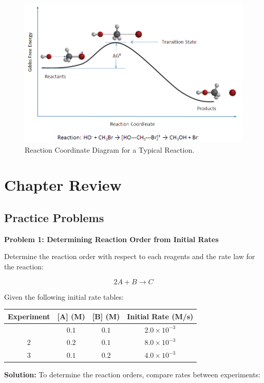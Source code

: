 \documentclass[
  9pt,
]{extbook}
\theoremstyle{definition}
\theoremstyle{definition}
\theoremstyle{definition}
\theoremstyle{definition}
\theoremstyle{remark}
\begin{document}
\begin{figure}

{\centering \includegraphics[width=0.7\linewidth]{./img/Rxn_coordinate_diagram_5} 

}

\caption{Reaction Coordinate Diagram for a Typical Reaction.}\label{fig:figk9}
\end{figure}

\section{Chapter Review}\label{rev15}

\subsection{Practice Problems}\label{exer15}

\textbf{Problem 1: Determining Reaction Order from Initial Rates}

Determine the reaction order with respect to each reagents and the rate law for the reaction:

\[2A + B \rightarrow C\]

Given the following initial rate tables:

\begin{longtable}[]{@{}cccc@{}}
\toprule\noalign{}
Experiment & {[}A{]} (M) & {[}B{]} (M) & Initial Rate (M/s) \\
\midrule\noalign{}
\endhead
\bottomrule\noalign{}
\endlastfoot
1 & \(0.1\) & \(0.1\) & \(2.0 \times 10^{-3}\) \\
2 & \(0.2\) & \(0.1\) & \(8.0 \times 10^{-3}\) \\
3 & \(0.1\) & \(0.2\) & \(4.0 \times 10^{-3}\) \\
\end{longtable}

\textbf{Solution:} To determine the reaction orders, compare rates between experiments:
\end{document}
